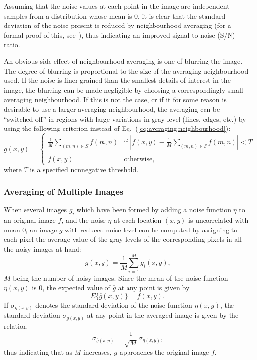 Assuming that the noise values at each point in the image are
independent samples from a distribution whose mean is 0, it is clear
that the standard deviation of the noise present is reduced by
neighbourhood averaging (for a formal proof of this,
see~\cite{digpic}), thus indicating an improved signal-to-noise (S/N)
ratio.

An obvious side-effect of neighbourhood averaging is one of blurring
the image.  The degree of blurring is proportional to the size of the
averaging neighbourhood used.  If the noise is finer grained than the
smallest details of interest in the image, the blurring can be made
negligible by choosing a correspondingly small averaging
neighbourhood.  If this is not the case, or if it for some reason is
desirable to use a larger averaging neighbourhood, the averaging can
be ``switched off'' in regions with large variations in gray level
(lines, edges, etc.) by using the following criterion instead of
Eq.~(\ref{eq:averaging:neighbourhood}):
\begin{equation}
  g(x,y)=\left\{
    \begin{array}{ll}
      \frac{1}{M}\sum_{(m,n)\in S}f(m,n) &
        \mbox{if $\left|f(x,y)-\frac{1}{M}\sum_{(m,n)\in
            S}f(m,n)\right|<T$} \\
             & \\
      f(x,y) & \mbox{otherwise,}
    \end{array}\right.
\end{equation}
where $T$ is a specified nonnegative threshold.

\subsubsection{Averaging of Multiple Images}

When several images $g_{i}$ which have been formed by adding a noise
function $\eta$ to an original image $f$, and the noise $\eta$ at each
location $(x,y)$ is uncorrelated with mean 0, an image $\overline{g}$
with reduced noise level can be computed by assigning to each pixel
the average value of the gray levels of the corresponding pixels in
all the noisy images at hand:
\begin{equation}
  \overline{g}(x,y)=\frac{1}{M}\sum_{i=1}^{M}g_{i}(x,y)\mbox{,}
\end{equation}
$M$ being the number of noisy images.  Since the mean of the noise
function $\eta(x,y)$ is 0, the expected value of $\overline{g}$ at any
point is given by
\begin{equation}
  E\{\overline{g}(x,y)\}=f(x,y)\mbox{.}
\end{equation}
If $\sigma_{\eta(x,y)}$ denotes the standard deviation of the noise
function $\eta(x,y)$, the standard deviation
$\sigma_{\overline{g}(x,y)}$ at any point in the averaged image is 
given by the relation
\begin{equation}
  \sigma_{\overline{g}(x,y)}=\frac{1}{\sqrt{M}}\sigma_{\eta(x,y)}\mbox{,}
\end{equation}
thus indicating that as $M$ increases, $\overline{g}$ approaches the
original image $f$.

